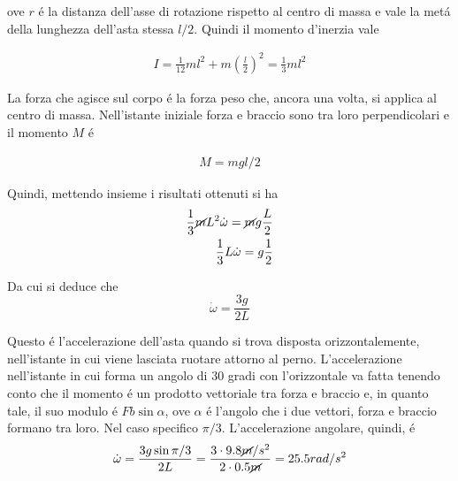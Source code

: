 \documentclass[17pt]{extarticle}
\begin{document}
ove $r$ \'e la distanza dell'asse di rotazione rispetto al centro di massa e vale la met\'a della lunghezza dell'asta stessa $l/2$. Quindi il momento d'inerzia vale

\begin{eqnarray}
	I = \frac{1}{12}ml^2 + m\left(\frac{l}{2}\right)^2 = \frac{1}{3}ml^2
\end{eqnarray}


La forza che agisce sul corpo \'e la forza peso che, ancora una volta, si applica al centro di massa. Nell'istante iniziale forza e braccio sono tra loro perpendicolari e il momento $M$ \'e

\begin{eqnarray}\label{eq:momento}
	M = mgl/2
\end{eqnarray}

Quindi, mettendo insieme i risultati ottenuti si ha
\begin{eqnarray}\nonumber
	\frac{1}{3}\cancel{m}L^2\dot{\omega} = \cancel{m}g\frac{L}{2}\\
	\frac{1}{3}L\dot{\omega} = g\frac{1}{2}
\end{eqnarray}

Da cui si deduce che 
\begin{equation}
	\dot{\omega} = \frac{3g}{2L}
\end{equation}

Questo \'e l'accelerazione dell'asta quando si trova disposta orizzontalemente, nell'istante in cui viene lasciata ruotare attorno al perno. L'accelerazione nell'istante in cui forma un angolo di 30 gradi con l'orizzontale va fatta tenendo conto che il momento \'e un prodotto vettoriale tra forza e braccio e, in quanto tale, il suo modulo \'e $Fb\sin{\alpha}$, ove $\alpha$ \'e l'angolo che i due vettori, forza e braccio formano tra loro. Nel caso specifico $\pi/3$. L'accelerazione angolare, quindi, \'e
\begin{eqnarray}
	\dot{\omega} = \frac{3g\sin{\pi/3} }{2L} = \frac{3\cdot 9.8 \cancel{m}/s^2}{2\cdot 0.5 \cancel{m}} = 25.5rad/s^2
\end{eqnarray}
\end{document}
